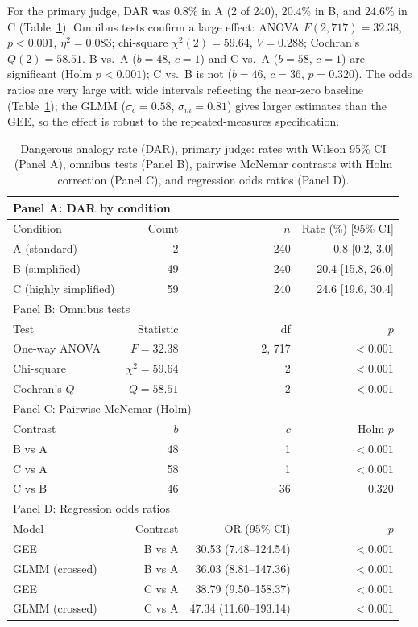 \documentclass[journal,article,submit,pdftex,moreauthors]{Definitions/mdpi}
\begin{document}
For the primary judge, DAR was $0.8\%$ in A (2 of 240), $20.4\%$ in B, and $24.6\%$ in C (Table~\ref{tab:da}). Omnibus tests confirm a large effect: ANOVA $F(2, 717) = 32.38$, $p < 0.001$, $\eta^2 = 0.083$; chi-square $\chi^2(2) = 59.64$, $V = 0.288$; Cochran's $Q(2) = 58.51$. B vs.\ A ($b = 48$, $c = 1$) and C vs.\ A ($b = 58$, $c = 1$) are significant (Holm $p < 0.001$); C vs.\ B is not ($b = 46$, $c = 36$, $p = 0.320$). The odds ratios are very large with wide intervals reflecting the near-zero baseline (Table~\ref{tab:da}); the GLMM ($\sigma_c = 0.58$, $\sigma_m = 0.81$) gives larger estimates than the GEE, so the effect is robust to the repeated-measures specification.

\begin{table}[H]
\caption{Dangerous analogy rate (DAR), primary judge: rates with Wilson 95\% CI (Panel A), omnibus tests (Panel B), pairwise McNemar contrasts with Holm correction (Panel C), and regression odds ratios (Panel D).}
\label{tab:da}
\centering
\small
\begin{tabular}{lrrr}
\toprule
\multicolumn{4}{l}{Panel A: DAR by condition} \\
\midrule
Condition & Count & $n$ & Rate (\%) [95\% CI] \\
\midrule
A (standard) & 2 & 240 & 0.8 [0.2, 3.0] \\
B (simplified) & 49 & 240 & 20.4 [15.8, 26.0] \\
C (highly simplified) & 59 & 240 & 24.6 [19.6, 30.4] \\
\midrule
\multicolumn{4}{l}{Panel B: Omnibus tests} \\
\midrule
Test & Statistic & df & $p$ \\
\midrule
One-way ANOVA & $F = 32.38$ & 2, 717 & $<0.001$ \\
Chi-square & $\chi^2 = 59.64$ & 2 & $<0.001$ \\
Cochran's $Q$ & $Q = 58.51$ & 2 & $<0.001$ \\
\midrule
\multicolumn{4}{l}{Panel C: Pairwise McNemar (Holm)} \\
\midrule
Contrast & $b$ & $c$ & Holm $p$ \\
\midrule
B vs A & 48 & 1 & $<0.001$ \\
C vs A & 58 & 1 & $<0.001$ \\
C vs B & 46 & 36 & 0.320 \\
\midrule
\multicolumn{4}{l}{Panel D: Regression odds ratios} \\
\midrule
Model & Contrast & OR (95\% CI) & $p$ \\
\midrule
GEE & B vs A & 30.53 (7.48--124.54) & $<0.001$ \\
GLMM (crossed) & B vs A & 36.03 (8.81--147.36) & $<0.001$ \\
GEE & C vs A & 38.79 (9.50--158.37) & $<0.001$ \\
GLMM (crossed) & C vs A & 47.34 (11.60--193.14) & $<0.001$ \\
\bottomrule
\end{tabular}
\end{table}
\end{document}
